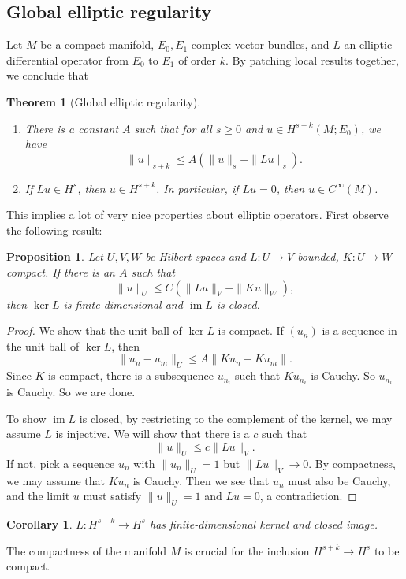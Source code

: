 \documentclass{shortart}
\newtheorem*{prop}{Proposition}
\newtheorem*{thm}{Theorem}
\newtheorem*{cor}{Corollary}
\theoremstyle{definition}
\DeclareMathOperator\im{im}
\begin{document}
\subsection{Global elliptic regularity}
Let $M$ be a compact manifold, $E_0, E_1$ complex vector bundles, and $L$ an elliptic differential operator from $E_0$ to $E_1$ of order $k$. By patching local results together, we conclude that
\begin{thm}[Global elliptic regularity]\leavevmode
  \begin{enumerate}
    \item There is a constant $A$ such that for all $s \geq 0$ and $u \in H^{s + k}(M; E_0)$, we have
      \[
        \|u\|_{s + k} \leq A(\|u\|_s + \|Lu\|_s).
      \]
    \item If $Lu \in H^s$, then $u \in H^{s + k}$. In particular, if $Lu = 0$, then $u \in C^\infty(M)$.\fakeqed
  \end{enumerate}
\end{thm}

This implies a lot of very nice properties about elliptic operators. First observe the following result:
\begin{prop}
  Let $U, V, W$ be Hilbert spaces and $L: U \to V$ bounded, $K: U \to W$ compact. If there is an $A$ such that
  \[
    \|u\|_U \leq C (\|L u\|_V + \|K u\|_W),
  \]
  then $\ker L$ is finite-dimensional and $\im L$ is closed.
\end{prop}

\begin{proof}
  We show that the unit ball of $\ker L$ is compact. If $(u_n)$ is a sequence in the unit ball of $\ker L$, then
  \[
    \|u_n - u_m\|_U \leq A \|Ku_n - Ku_m\|.
  \]
  Since $K$ is compact, there is a subsequence $u_{n_i}$ such that $K u_{n_i}$ is Cauchy. So $u_{n_i}$ is Cauchy. So we are done.

  To show $\im L$ is closed, by restricting to the complement of the kernel, we may assume $L$ is injective. We will show that there is a $c$ such that
  \[
    \|u\|_U \leq c \|L u\|_V.
  \]
  If not, pick a sequence $u_n$ with $\|u_n\|_U = 1$ but $\|L u\|_V \to 0$. By compactness, we may assume that $Ku_n$ is Cauchy. Then we see that $u_n$ must also be Cauchy, and the limit $u$ must satisfy $\|u\|_U = 1$ and $Lu = 0$, a contradiction.
\end{proof}

\begin{cor}
  $L: H^{s + k} \to H^s$ has finite-dimensional kernel and closed image.\fakeqed
\end{cor}
The compactness of the manifold $M$ is crucial for the inclusion $H^{s + k} \to H^s$ to be compact.
\end{document}
